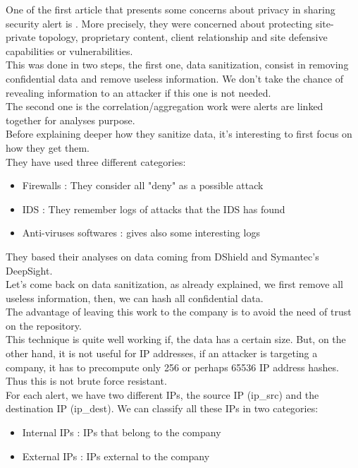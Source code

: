 \documentclass{eplmastersthesis}
\begin{document}
One of the first article that presents some concerns about privacy in sharing security alert is \cite{lincoln2004privacy}.
More precisely, they were concerned about protecting site-private topology, proprietary content, client relationship and site defensive capabilities or vulnerabilities.\\
This was done in two steps, the first one, data sanitization, consist in removing confidential data and remove useless information. We don't take the chance of revealing information to an attacker if this one is not needed.\\
The second one is the correlation/aggregation work were alerts are linked together for analyses purpose.\\
Before explaining deeper how they sanitize data, it's interesting to first focus on how they get them.\\
 They have used three different categories:
\begin{itemize}
\item Firewalls : They consider all "deny" as a possible attack
\item IDS : They remember logs of attacks that the IDS has found
\item Anti-viruses softwares : gives also some interesting logs
\end{itemize}
They based their analyses on data coming from DShield and Symantec's DeepSight.\\

Let's come back on data sanitization, as already explained, we first remove all useless information, then, we can hash all confidential data.\\
The advantage of leaving this work to the company is to avoid the need of trust on the repository.\\
This technique is quite well working if, the data has a certain size. But, on the other hand, it is not useful for IP addresses, if an attacker is targeting a company, it has to precompute only 256 or perhaps 65536 IP address hashes. Thus this is not brute force resistant.\\
For each alert, we have two different IPs, the source IP (ip\_src) and the destination IP (ip\_dest). We can classify all these IPs in two categories:
\begin{itemize}
	\item Internal IPs : IPs that belong to the company
	\item External IPs : IPs external to the company
\end{itemize}
\end{document}

